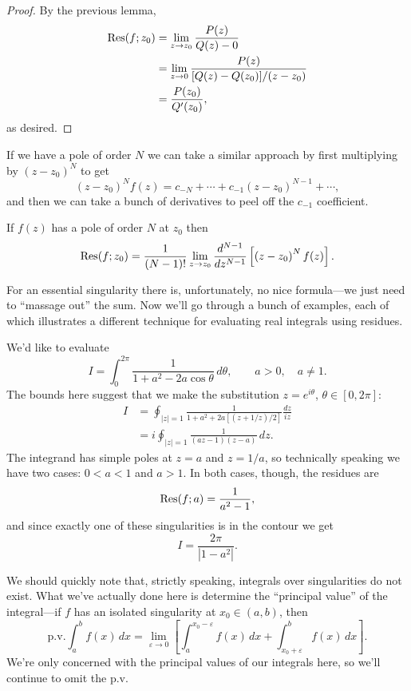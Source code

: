 \documentclass[../m136main.tex]{subfiles}
\begin{document}
\begin{proof}
    By the previous lemma,
    \begin{align*}
        \operatorname{Res}(f; z_0) &= \lim_{z \to z_0} \frac{P(z)}{Q(z) - 0} \\
        &= \lim_{z \to 0} \frac{P(z)}{[Q(z) - Q(z_0)] / (z - z_0)} \\
        &= \frac{P(z_0)}{Q'(z_0)},
    \end{align*}
    as desired.
\end{proof}

If we have a pole of order $N$ we can take a similar approach by first multiplying by $(z - z_0)^{N}$ to get
\[ (z - z_0)^{N} f(z) = c_{-N} + \cdots + c_{-1} (z - z_0)^{N-1} + \cdots, \]
and then we can take a bunch of derivatives to peel off the $c_{-1}$ coefficient.

\begin{theorem}[]
    If $f(z)$ has a pole of order $N$ at $z_0$ then
    \[ \operatorname{Res}(f; z_0) = \frac{1}{(N-1)!} \lim_{z \to z_0} \frac{d^{N-1}}{dz^{N-1}} \left[ \left( z - z_0 \right)^{N} f(z) \right]. \]
\end{theorem}

For an essential singularity there is, unfortunately, no nice formula---we just need to ``massage out'' the sum.
Now we'll go through a bunch of examples, each of which illustrates a different technique for evaluating real integrals using residues.

\begin{example}[Parametrization]
    We'd like to evaluate
    \[ I = \int_{0}^{2\pi} \frac{1}{1 + a^2 - 2a \cos \theta} \,d\theta, \qquad a > 0, \quad a \neq 1. \]
    The bounds here suggest that we make the substitution  $z = e^{i\theta}$, $\theta \in [0,2\pi]$:
    \begin{align*}
        I &= \oint_{|z| = 1} \frac{1}{1 + a^2 + 2a [(z + 1 / z) / 2]} \frac{dz}{iz} \\
        &= i \oint_{|z| = 1} \frac{1}{(az - 1)(z - a)} \,dz.
    \end{align*}
    The integrand has simple poles at $z = a$ and $z = 1 / a$, so technically speaking we have two cases: $0 < a < 1$ and $a > 1$.
    In both cases, though, the residues are
    \[ \operatorname{Res}(f; a) = \frac{1}{a^2 - 1}, \]
    and since exactly one of these singularities is in the contour we get
    \[ I = \frac{2\pi}{|1 - a^2|}. \]
\end{example}

We should quickly note that, strictly speaking, integrals over singularities do not exist.
What we've actually done here is determine the ``principal value'' of the integral---if $f$ has an isolated singularity at $x_0 \in (a,b)$, then
\[ \textrm{p.v.} \int_{a}^{b} f(x) \,dx = \lim_{\varepsilon \to 0} \left[ \int_{a}^{x_0 - \varepsilon} f(x) \,dx + \int_{x_0 + \varepsilon}^{b} f(x) \,dx \right]. \]
We're only concerned with the principal values of our integrals here, so we'll continue to omit the \textrm{p.v.}
\end{document}
